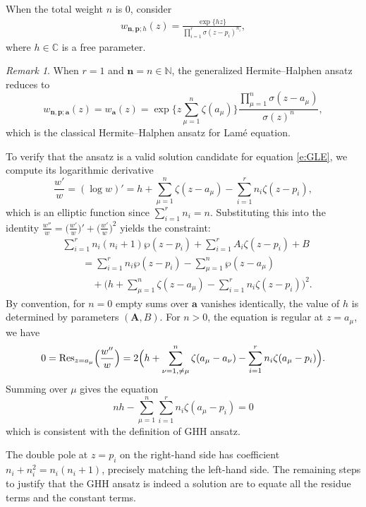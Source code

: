 \documentclass[11pt]{amsart}
\theoremstyle{remark}
\newtheorem{remark}[theorem]{Remark}
\numberwithin{equation}{section}
\begin{document}
When the total weight $n$ is $0$, consider 
\begin{equation} \label{e:GHH_zero}
\begin{split}
w_{\mathbf{n},\mathbf{p};h}(z) = \frac{\exp\{ hz \}}{\displaystyle\prod_{i = 1}^{r}\sigma(z - p_i)^{n_i}},
\end{split}
\end{equation}
where $h \in \mathbb{C}$ is a free parameter. 

\begin{remark}
When $r=1$ and $\mathbf{n} = n \in \mathbb{N}$, the generalized Hermite--Halphen ansatz reduces to 
\[
w_{\mathbf{n}, \mathbf{p} ;  \mathbf{a} }(z) = w_{\mathbf{a}}(z)
= \exp \Big\{ z \sum_{\mu = 1}^n \zeta(a_\mu) \Big\}  
\frac{\prod_{\mu = 1}^n  \sigma(z - a_\mu)}{\sigma(z)^n},
\]
which is the classical Hermite--Halphen ansatz for Lam\'e equation.
\end{remark}

To verify that the ansatz is a valid solution candidate for equation \eqref{e:GLE}, we compute its logarithmic derivative 
\[
\frac{w'}{w} = (\log w)' = h + \sum_{\mu = 1}^n \zeta(z - a_\mu) - \sum_{i = 1}^{r} n_i \zeta(z - p_i),
\]
which is an elliptic function since $\sum_{i = 1}^r n_i = n$. Substituting this into the identity $\frac{w''}{w} = \big( \frac{w'}{w} \big)' + \big( \frac{w'}{w} \big)^2$ yields the constraint:
\begin{equation} \label{e:constraint}
\begin{split}
&\sum_{i=1}^{r} n_i (n_i + 1)\wp (z - p_i) + \sum_{i = 1}^r A_i \zeta(z - p_i) + B \\
&\qquad= \sum_{i = 1}^{r} n_i \wp(z - p_i) - \sum_{\mu = 1}^n \wp(z - a_\mu) \\
& \qquad \quad + \Big( h +
 \sum_{\mu = 1}^n \zeta(z - a_\mu) - \sum_{i = 1}^{r} n_i \zeta(z - p_i)
 \Big)^2.
\end{split}
\end{equation}
By convention, for $n=0$ empty sums over $\mathbf{a}$ vanishes identically, the value of $h$ is determined by parameters $(\mathbf{A},B)$. For $n>0$, the equation is regular at $z= a_\mu$, we have
\[
    0 = {\rm Res}_{z=a_\mu} \Big(\frac{w''}{w} \Big) = 2 \Big( h + \sum_{\nu = 1, \neq \mu}^n \zeta(a_\mu - a_\nu) - \sum_{i = 1}^{r} n_i \zeta(a_\mu - p_i) \Big).
\]
Summing over $\mu$ gives the equation 
\[
    n h - \sum_{\mu=1}^n\sum_{i=1}^r n_i \zeta(a_\mu-p_i) =0
\]
which is consistent with the definition of GHH ansatz.

The double pole at $z = p_i$ on the right-hand side has coefficient $n_i + n_i^2 = n_i(n_i + 1)$, precisely matching the left-hand side. The remaining steps to justify that the GHH ansatz is indeed a solution are to equate all the residue
terms and the constant terms.
\end{document}
